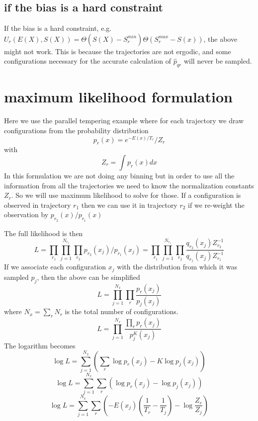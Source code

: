 \documentclass[a4paper]{article}
\begin{document}
\subsection{if the bias is a hard constraint}

If the bias is a hard constraint, e.g. $U_r(E(X), S(X)) = \Theta(S(X)-S_{r}^{min}) \Theta(S_{r}^{max}-S(x))$, the above might not work.
This is because the trajectories are not ergodic, and some configurations necessary for the accurate calculation of $\hat{p}_{qr}$
will never be sampled.

\section{maximum likelihood formulation}

Here we use the parallel tempering example where for each trajectory we draw configurations
from the probability distribution
\begin{equation}
p_r(x) = e^{- E(x) / T_r} / Z_{r}
\end{equation}
with 
\begin{equation}
Z_r = \int p_r(x) dx
\end{equation}
In this formulation we are not doing any binning but in
order to use all the information from all the trajectories we need to know the normalization constants
$Z_r$.  So we will use maximum likelihood to solve for those.
If a configuration is observed in trajectory $r_1$ then we can use it in trajectory $r_2$ if we re-weight 
the observation by $p_{r_2}(x) / p_{r_1}(x)$

The full likelihood is then
\begin{equation}
L = \prod_{r_1} \prod_{j=1}^{N_{r_1}} \prod_{r_2} p_{r_2} (x_j) / p_{r_1} (x_j) 
= \prod_{r_1} \prod_{j=1}^{N_{r_1}} \prod_{r_2} \frac{q_{r_2}(x_j) Z_{r_2}^{-1}}{q_{r_1}(x_j) Z_{r_1}^{-1}} 
\end{equation}
If we associate each configuration $x_j$ with the distribution from which it was sampled $p_j$, then the above can
be simplified
\begin{equation}
L = \prod_{j=1}^{N_{x}} \prod_{r} \frac{p_{r}(x_j) }{p_{j}(x_j)} 
\end{equation}
where $N_{x} = \sum_r N_r$ is the total number of configurations. 
\begin{equation}
L = \prod_{j=1}^{N_{x}} \frac{\prod_{r} p_{r}(x_j) }{p_{j}^{K} (x_j)} 
\end{equation}
The logarithm becomes
\begin{equation}
\log L = \sum_{j=1}^{N_{x}} ( \sum_{r} \log p_{r}(x_j)  - K \log p_{j} (x_j) )
\end{equation}
\begin{equation}
\log L = \sum_{j=1}^{N_{x}} \sum_{r} ( \log p_{r}(x_j)  - \log p_{j} (x_j) )
\end{equation}
\begin{equation}
\log L = \sum_{j=1}^{N_{x}} \sum_{r} \left(  -E(x_j) \left( \frac{1}{T_r} - \frac{1}{T_j} \right)  - \log \frac{Z_r}{Z_j} \right)
\end{equation}
\end{document}
